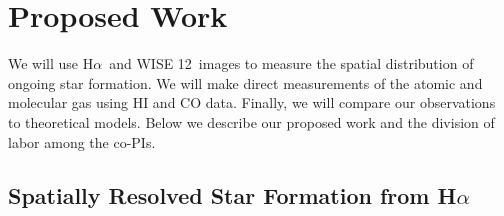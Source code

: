 \documentclass[11pt, preprint]{aastex}
\newcommand{\ha}{H$\alpha$}
\begin{document}
\vspace*{-1cm}\section{Proposed Work} 
\vspace*{-.2cm}
We will use \ha\ and WISE 12\micron\ images to measure the spatial distribution of ongoing star formation.  We will make direct measurements of the atomic and molecular gas using HI and CO data.  Finally, we will compare our observations to  theoretical models.
Below we describe our proposed work and the division of labor among the co-PIs.







\vspace*{-1cm}
\subsection{Spatially Resolved Star Formation from \ha}
\vspace*{-.3cm}
\end{document}
